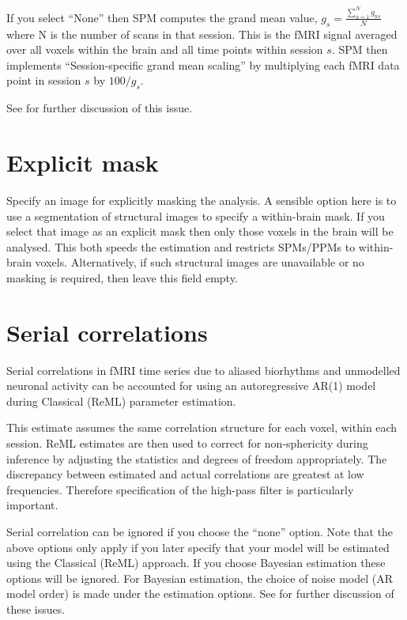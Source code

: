 If you select ``None'' then SPM computes the grand mean value, $g_s=\frac{\sum_{n=1}^N g_{ns}}{N}$ where N is the number of scans in that session. This is the fMRI signal averaged over all voxels within the brain and all time points within session $s$. SPM then implements ``Session-specific grand mean scaling'' by multiplying each fMRI data point in session $s$ by $100/g_s$.

See \cite{ja_global} for further discussion of this issue.

\section{Explicit mask}

Specify an image for explicitly masking the analysis. A sensible option here is to use a segmentation of structural images to specify a within-brain mask. If you select that image as an explicit mask then only those voxels in the brain will be analysed. This both speeds the estimation and restricts SPMs/PPMs to within-brain voxels. Alternatively, if such structural images are unavailable or no masking is required, then leave this field empty.

\section{Serial correlations}

Serial correlations in fMRI time series due to aliased biorhythms and unmodelled neuronal activity can be accounted for using an autoregressive AR(1) model during Classical (ReML) parameter estimation.  

This estimate assumes the same correlation structure for each voxel, within each session.  ReML estimates are then used to correct for non-sphericity during inference by adjusting the statistics and degrees of freedom appropriately. The discrepancy between estimated and actual correlations are greatest at low frequencies.  Therefore specification of the high-pass filter is particularly important.

Serial correlation can be ignored if you choose the ``none'' option. Note that the above options only apply if you later specify that your model will be estimated using the Classical (ReML) approach. If you choose Bayesian estimation these options will be ignored. For Bayesian estimation, the choice of noise model (AR model order) is made under the estimation options. See \cite{peb1,vb_fmri_ar} for further discussion of these issues.

